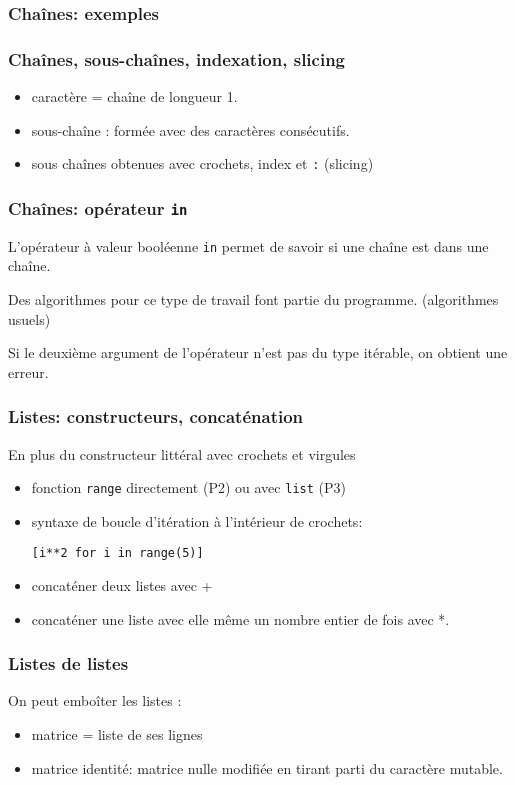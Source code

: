 \begin{frame}
  \frametitle{Chaînes: exemples}

\end{frame}

\begin{frame}
  \frametitle{Chaînes, sous-chaînes, indexation, slicing}
\begin{itemize}
  \item caractère = chaîne de longueur 1.
  \item sous-chaîne : formée avec des caractères consécutifs.
  \item sous chaînes obtenues avec crochets, index et \texttt{:} (slicing)
\end{itemize}

\end{frame}

\begin{frame}
  \frametitle{Chaînes: opérateur \texttt{in}}
  L'opérateur à valeur booléenne \texttt{in} permet de savoir si une chaîne est dans une chaîne.
  
  Des algorithmes pour ce type de travail font partie du programme. (algorithmes usuels)
  
  Si le deuxième argument de l'opérateur n'est pas du type itérable, on obtient une erreur.
\end{frame}

\begin{frame}
  \frametitle{Listes: constructeurs, concaténation}
  En plus du constructeur littéral avec crochets et virgules
  \begin{itemize}
    \item fonction \texttt{range} directement (P2) ou avec \texttt{list} (P3)
    \item syntaxe de boucle d'itération à l'intérieur de crochets:
      \begin{center}
        \texttt{[i**2 for i in range(5)]}
      \end{center}
    \item concaténer deux listes avec +
    \item concaténer une liste avec elle même un nombre entier de fois avec *.
  \end{itemize}
\end{frame}

\begin{frame}
  \frametitle{Listes de listes}
  On peut emboîter les listes :
  \begin{itemize}
    \item matrice = liste de ses lignes
    \item matrice identité: matrice nulle modifiée en tirant parti du caractère mutable.
  \end{itemize}
  
\end{frame}

